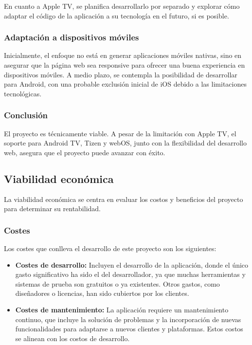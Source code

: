 En cuanto a Apple TV, se planifica desarrollarlo por separado y explorar cómo adaptar el código de la aplicación 
a su tecnología en el futuro, si es posible.

\subsubsection{Adaptación a dispositivos móviles}
\label{subsubsec:analisis_estudio_viabilidad_tecnica_aplicacion_movil}

Inicialmente, el enfoque no está en generar aplicaciones móviles nativas, sino en asegurar que la página web 
sea responsive para ofrecer una buena experiencia en dispositivos móviles. A medio plazo, se contempla la 
posibilidad de desarrollar para Android, con una probable exclusión inicial de iOS debido a las limitaciones tecnológicas.

\subsubsection{Conclusión}
\label{subsubsec:analisis_estudio_viabilidad_tecnica_conclusion}

El proyecto es técnicamente viable. A pesar de la limitación con Apple TV, el soporte para Android TV, Tizen 
y webOS, junto con la flexibilidad del desarrollo web, asegura que el proyecto puede avanzar con éxito.

\subsection{Viabilidad económica}
\label{subsec:analisis_estudio_viabilidad_economica}

La viabilidad económica se centra en evaluar los costos y beneficios del proyecto para determinar su rentabilidad.

\subsubsection{Costes}
\label{subsubsec:analisis_estudio_viabilidad_economica_costes}
Los costes que conlleva el desarrollo de este proyecto son los siguientes:

\begin{itemize}
    \item \textbf{Costes de desarrollo:} Incluyen el desarrollo de la aplicación, donde el único gasto significativo ha sido 
    el del desarrollador, ya que muchas herramientas y sistemas de prueba son gratuitos o ya existentes. Otros gastos, 
    como diseñadores o licencias, han sido cubiertos por los clientes.
    
    \item \textbf{Costes de mantenimiento:} La aplicación requiere un mantenimiento continuo, que incluye la solución de 
    problemas y la incorporación de nuevas funcionalidades para adaptarse a nuevos clientes y plataformas. Estos costos 
    se alinean con los costos de desarrollo.
\end{itemize}


